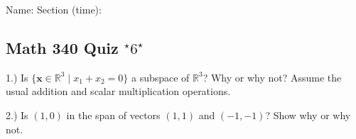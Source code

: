 \documentclass{article}
\begin{document}
Name: 
\medskip
Section (time):

\subsection*{Math 340 Quiz $^\star6^\star$}

1.) Is $\{\mathbf{x}\in \mathbb{R}^3 \mid x_1+x_2=0\}$ a subspace of $\mathbb{R}^3$? Why or why not? Assume the usual addition and scalar multiplication operations. 


2.) Is $(1,0)$ in the span of vectors $(1,1)$ and $(-1,-1)$? Show why or why not.
\end{document}
